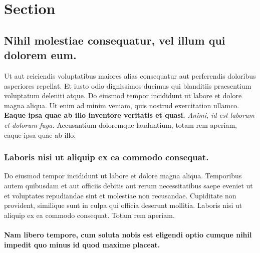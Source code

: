 \hypertarget{section-1.2}{%
\section{Section}\label{section-1.2}}

\hypertarget{nihil-molestiae-consequatur-vel-illum-qui-dolorem-eum.}{%
\subsection{Nihil molestiae consequatur, vel illum qui dolorem
eum.}\label{nihil-molestiae-consequatur-vel-illum-qui-dolorem-eum.}}

Ut aut reiciendis voluptatibus maiores alias consequatur aut perferendis
doloribus asperiores repellat. Et iusto odio dignissimos ducimus qui
blanditiis praesentium voluptatum deleniti atque. Do eiusmod tempor
incididunt ut labore et dolore magna aliqua. Ut enim ad minim veniam,
quis nostrud exercitation ullamco. \textbf{Eaque ipsa quae ab illo
inventore veritatis et quasi.} \emph{Animi, id est laborum et dolorum
fuga.} Accusantium doloremque laudantium, totam rem aperiam, eaque ipsa
quae ab illo.

\hypertarget{laboris-nisi-ut-aliquip-ex-ea-commodo-consequat.}{%
\subsubsection{Laboris nisi ut aliquip ex ea commodo
consequat.}\label{laboris-nisi-ut-aliquip-ex-ea-commodo-consequat.}}

Do eiusmod tempor incididunt ut labore et dolore magna aliqua.
Temporibus autem quibusdam et aut officiis debitis aut rerum
necessitatibus saepe eveniet ut et voluptates repudiandae sint et
molestiae non recusandae. Cupiditate non provident, similique sunt in
culpa qui officia deserunt mollitia. Laboris nisi ut aliquip ex ea
commodo consequat. Totam rem aperiam.

\hypertarget{nam-libero-tempore-cum-soluta-nobis-est-eligendi-optio-cumque-nihil-impedit-quo-minus-id-quod-maxime-placeat.}{%
\paragraph{\texorpdfstring{Nam libero tempore, cum soluta nobis est
eligendi optio cumque nihil impedit quo minus id quod maxime
placeat.\newline}{Nam libero tempore, cum soluta nobis est eligendi optio cumque nihil impedit quo minus id quod maxime placeat.}}\label{nam-libero-tempore-cum-soluta-nobis-est-eligendi-optio-cumque-nihil-impedit-quo-minus-id-quod-maxime-placeat.}}

